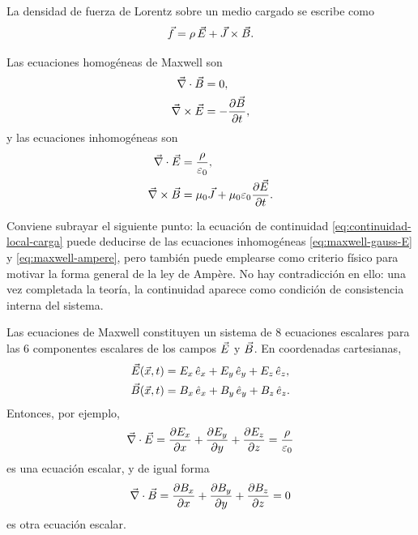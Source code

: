 \documentclass[../main.tex]{subfiles}
\begin{document}
La densidad de fuerza de Lorentz sobre un medio cargado se escribe como
\begin{equation*}
    \vec f = \rho\, \vec{E} + \vec{J} \times \vec{B}.
\end{equation*}

Las ecuaciones homogéneas de Maxwell son
\begin{align}
    \vec\nabla\cdot\vec{B}&=0,
    \label{eq:maxwell-gauss-B}\\
    \vec\nabla\times\vec{E}&=-\frac{\partial\vec{B}}{\partial t},
    \label{eq:maxwell-faraday}
\end{align}
y las ecuaciones inhomogéneas son
\begin{align}
    \vec\nabla\cdot\vec{E}&=\frac{\rho}{\varepsilon_0},
    \label{eq:maxwell-gauss-E}\\
    \vec\nabla\times\vec{B}&=\mu_0\vec{J}+\mu_0\varepsilon_0\frac{\partial\vec{E}}{\partial t}.
    \label{eq:maxwell-ampere}
\end{align}

Conviene subrayar el siguiente punto: la ecuación de continuidad \eqref{eq:continuidad-local-carga} puede deducirse de las ecuaciones inhomogéneas \eqref{eq:maxwell-gauss-E} y \eqref{eq:maxwell-ampere}, pero también puede emplearse como criterio físico para motivar la forma general de la ley de Ampère. No hay contradicción en ello: una vez completada la teoría, la continuidad aparece como condición de consistencia interna del sistema.

Las ecuaciones de Maxwell constituyen un sistema de $8$ ecuaciones escalares para las $6$ componentes escalares de los campos $\vec{E}$ y $\vec{B}$. En coordenadas cartesianas,
\begin{align*}
    \vec{E}(\vec x, t) &= E_x\,\hat e_x + E_y \, \hat e_y + E_z \,\hat e_z,\\
    \vec{B}(\vec x, t) &= B_x\,\hat e_x + B_y \, \hat e_y + B_z \,\hat e_z.
\end{align*}
Entonces, por ejemplo,
\begin{equation*}
    \vec\nabla\cdot\vec{E}=\frac{\partial E_x}{\partial x}+\frac{\partial E_y}{\partial y}+\frac{\partial E_z}{\partial z}=\frac{\rho}{\varepsilon_0}
\end{equation*}
es una ecuación escalar, y de igual forma
\begin{equation*}
    \vec\nabla\cdot\vec{B}=\frac{\partial B_x}{\partial x}+\frac{\partial B_y}{\partial y}+\frac{\partial B_z}{\partial z}=0
\end{equation*}
es otra ecuación escalar.
\end{document}
